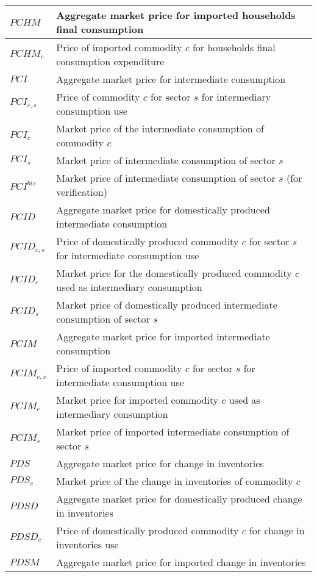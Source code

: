 \documentclass[12pt]{article}
\numberwithin{equation}{section}
\begin{document}
\begin{longtable}{@{}p{4cm}p{9cm}@{}}
 \midrule 
$PCHM$ & Aggregate market price for imported households final consumption \\
 \midrule 
$PCHM_{c}$ & Price of imported commodity $c$ for households final consumption expenditure \\
 \midrule 
$PCI$ & Aggregate market price for intermediate consumption \\
 \midrule 
$PCI_{c, s}$ & Price of commodity $c$ for sector $s$ for intermediary consumption use \\
 \midrule 
$PCI_{c}$ & Market price of the intermediate consumption of commodity $c$ \\
 \midrule 
$PCI_{s}$ & Market price of intermediate consumption of sector $s$ \\
 \midrule 
$PCI^{bis}$ & Market price of intermediate consumption of sector $s$ (for verification) \\
 \midrule 
$PCID$ & Aggregate market price for domestically produced intermediate consumption \\
 \midrule 
$PCID_{c, s}$ & Price of domestically produced commodity $c$ for sector $s$ for intermediate consumption use \\
 \midrule 
$PCID_{c}$ & Market price for the domestically produced commodity $c$ used as intermediary consumption \\
 \midrule 
$PCID_{s}$ & Market price of domestically produced intermediate consumption of sector $s$ \\
 \midrule 
$PCIM$ & Aggregate market price for imported intermediate consumption \\
 \midrule 
$PCIM_{c, s}$ & Price of imported commodity $c$ for sector $s$ for intermediate consumption use \\
 \midrule 
$PCIM_{c}$ & Market price for imported commodity $c$ used as intermediary consumption \\
 \midrule 
$PCIM_{s}$ & Market price of imported intermediate consumption of sector $s$ \\
 \midrule 
$PDS$ & Aggregate market price for change in inventories \\
 \midrule 
$PDS_{c}$ & Market price of the change in inventories of commodity $c$ \\
 \midrule 
$PDSD$ & Aggregate market price for domestically produced change in inventories \\
 \midrule 
$PDSD_{c}$ & Price of domestically produced commodity $c$ for change in inventories use \\
 \midrule 
$PDSM$ & Aggregate market price for imported change in inventories \\

\end{longtable}
\end{document}
